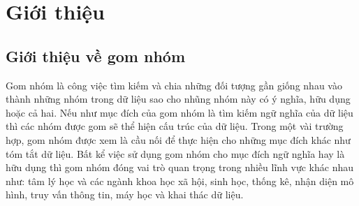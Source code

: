 \chapter{Giới thiệu}
\label{Chapter1}

\section{Giới thiệu về gom nhóm}

Gom nhóm là công việc tìm kiếm và chia những đối tượng gần giống nhau vào thành những nhóm trong dữ liệu sao cho nhũng nhóm này có ý nghĩa, hữu dụng hoặc cả hai. %
Nếu như mục đích của gom nhóm là tìm kiếm ngữ nghĩa của dữ liệu thì các nhóm được gom sẽ thể hiện cấu trúc của dữ liệu.
Trong một vài trường hợp, gom nhóm được xem là cầu nối để thực hiện cho những mục đích khác như tóm tắt dữ liệu.
Bất kể việc sử dụng gom nhóm cho mục đích ngữ nghĩa hay là hữu dụng thì gom nhóm đóng vai trò quan trọng trong nhiều lĩnh vực khác nhau như: tâm lý học và các ngành khoa học xã hội, sinh học, thống kê, nhận diện mô hình, truy vấn thông tin, máy học và khai thác dữ liệu.

